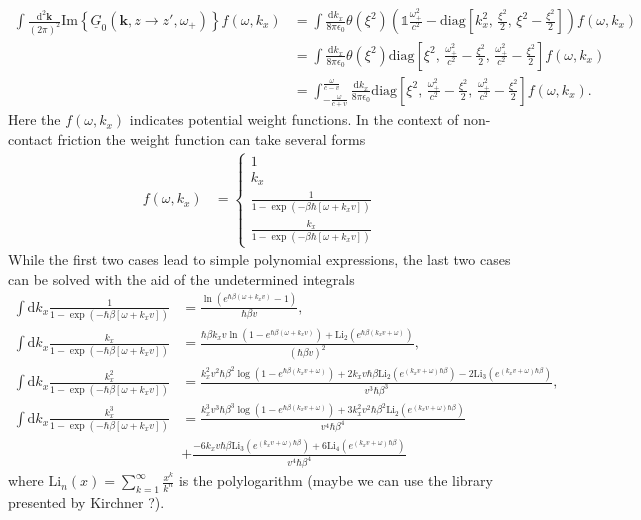 \documentclass[11pt]{article}
\newcommand{\vv}[1]{\mathbf{#1}}
\newcommand{\dd}[0]{\mathrm{d}}
\begin{document}
\begin{align}
  \int\frac{\dd^2\vv k}{(2\pi)^2}  \mathrm{Im}\left\{\underline{G}_0(\vv k, z\to z',\omega_+)\right\}f(\omega,k_x) &=
  \int\frac{\dd k_x}{8\pi\epsilon_0} 
  \theta(\xi^2)
  \left(
  \mathbb{1}\frac{\omega_+^2}{c^2} -
    \mathrm{diag}\left[
      k_x^2,\,\frac{\xi^2}{2},\,\xi^2-\frac{\xi^2}{2}
    \right]
  \right)f(\omega,k_x)
  \\
&=
  \int\frac{\dd k_x}{8\pi\epsilon_0} 
  \theta(\xi^2)
    \mathrm{diag}\left[
      \xi^2,\,\frac{\omega_+^2}{c^2}-\frac{\xi^2}{2},\,\frac{\omega_+^2}{c^2}-\frac{\xi^2}{2}    \right]f(\omega,k_x)
  \\
&=
\int_{-\frac{\omega}{c+v}}^{\frac{\omega}{c-v}}\frac{\dd k_x}{8\pi\epsilon_0} 
    \mathrm{diag}\left[
      \xi^2,\,\frac{\omega_+^2}{c^2}-\frac{\xi^2}{2},\,\frac{\omega_+^2}{c^2}-\frac{\xi^2}{2}    \right]f(\omega,k_x)
      .
\end{align}
Here the $f(\omega,k_x)$ indicates potential weight functions. In the context of non-contact friction the weight function can take several forms
\begin{align}
  f(\omega,k_x) &= 
  \begin{cases}
  1
  \\
  k_x
  \\
  \frac{1}{1-\exp(-\beta\hbar[\omega+k_xv])}
  \\
  \frac{k_x}{1-\exp(-\beta\hbar[\omega+k_xv])}
  \end{cases}
\end{align}
While the first two cases lead to simple polynomial expressions, the last two cases can be solved with the aid of the undetermined integrals
\begin{align}
  \int \dd k_x \frac{1}{1-\exp(-\hbar\beta[\omega+k_x v])} &= \frac{\ln\left(e^{\hbar\beta(\omega+k_xv)}-1\right)}{\hbar\beta v}
  ,\\
  \int \dd k_x \frac{k_x}{1-\exp(-\hbar\beta[\omega+k_x v])} &= \frac{\hbar\beta k_x v\ln\left(1-e^{\hbar\beta(\omega+k_xv)}\right) + \mathrm{Li}_2(e^{\hbar\beta(k_xv+\omega)})}{(\hbar\beta v)^2}
  ,\\
  \int \dd k_x \frac{k_x^2}{1-\exp(-\hbar\beta[\omega+k_x v])} &=\frac{k_x^2 v^2 \hbar \beta ^2 \log \left(1-e^{\hbar \beta  (k_x v+\omega )}\right)+2 k_x v \hbar \beta  \text{Li}_2\left(e^{(k_x v+\omega ) \hbar \beta }\right)-2 \text{Li}_3\left(e^{(k_x v+\omega ) \hbar \beta }\right)}{v^3 \hbar \beta ^3} 
  ,\\
  \int \dd k_x \frac{k_x^3}{1-\exp(-\hbar\beta[\omega+k_x v])} &=\frac{k_x^3 v^3 \hbar \beta ^3 \log \left(1-e^{\hbar \beta  (k_x v+\omega )}\right)+3 k_x^2 v^2 \hbar \beta ^2 \text{Li}_2\left(e^{(k_x v+\omega ) \hbar \beta }\right)}{v^4 \hbar \beta ^4} 
\\
&+
\frac{-6 k_x v \hbar \beta  \text{Li}_3\left(e^{(k_x v+\omega ) \hbar \beta }\right)+6 \text{Li}_4\left(e^{(k_x v+\omega ) \hbar \beta }\right)}{v^4 \hbar \beta ^4} 
\end{align}
where $\mathrm{Li}_n(x)=\sum_{k=1}^\infty \frac{x^k}{k^n}$ is the polylogarithm (maybe we can use the library presented by Kirchner \cite{kirchner2016}?).	
\end{document}
